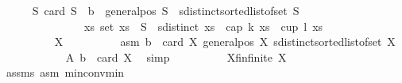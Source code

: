 \begin{isabellebody}
\begin{isamarkuptext}
\end{isamarkuptext}\isamarkuptrue%
\ \ \ \ \isamarkupfalse%
\ {\isachardoublequoteopen}{\isasymforall}S{\isachardot}{\kern0pt}\ card\ S\ {\isacharequal}{\kern0pt}\ {\isacharquery}{\kern0pt}b\ {\isasymand}\ general{\isacharunderscore}{\kern0pt}pos\ S\ {\isasymand}\ sdistinct{\isacharparenleft}{\kern0pt}sorted{\isacharunderscore}{\kern0pt}list{\isacharunderscore}{\kern0pt}of{\isacharunderscore}{\kern0pt}set\ S{\isacharparenright}{\kern0pt}\ \isanewline
\ \ \ \ \ \ \ \ \ \ \ \ \ \ {\isasymlongrightarrow}\ {\isacharparenleft}{\kern0pt}{\isasymexists}xs{\isachardot}{\kern0pt}\ {\isacharparenleft}{\kern0pt}set\ xs\ {\isasymsubseteq}\ S\ {\isasymand}\ sdistinct\ xs\ {\isasymand}\ {\isacharparenleft}{\kern0pt}cap\ k\ xs\ {\isasymor}\ cup\ l\ xs{\isacharparenright}{\kern0pt}{\isacharparenright}{\kern0pt}{\isacharparenright}{\kern0pt}{\isachardoublequoteclose}\isanewline
\ \ \ \ \isamarkupfalse%
{\isacharminus}{\kern0pt}\isanewline
\ \ \ \ \ \ \isakeywordONE{{\isacharbraceleft}{\kern0pt}}\isamarkupfalse%
\isanewline
\ \ \ \ \ \ \ \ \isamarkupfalse%
\ X\isanewline
\ \ \ \ \ \ \ \ \isamarkupfalse%
\ asm{\isacharcolon}{\kern0pt}\ {\isachardoublequoteopen}{\isacharquery}{\kern0pt}b\ {\isacharequal}{\kern0pt}\ card\ X{\isachardoublequoteclose}\ {\isachardoublequoteopen}general{\isacharunderscore}{\kern0pt}pos\ X{\isachardoublequoteclose}\ {\isachardoublequoteopen}sdistinct{\isacharparenleft}{\kern0pt}sorted{\isacharunderscore}{\kern0pt}list{\isacharunderscore}{\kern0pt}of{\isacharunderscore}{\kern0pt}set\ X{\isacharparenright}{\kern0pt}{\isachardoublequoteclose}\isanewline
\ \ \ \ \ \ \ \ \isamarkupfalse%
\ \ \ A{}{\isacharcolon}{\kern0pt}\ {\isachardoublequoteopen}{\isacharquery}{\kern0pt}b\ {\isasymle}\ card\ X{\isachardoublequoteclose}\ \isamarkupfalse%
\ simp\isanewline
\ \ \ \ \ \ \ \ \isamarkupfalse%
\ X{\isacharunderscore}{\kern0pt}fin{\isacharcolon}{\kern0pt}{\isachardoublequoteopen}finite\ X{\isachardoublequoteclose}\ \isamarkupfalse%
\ assms{\isacharparenleft}{\kern0pt}{}{\isacharcomma}{\kern0pt}{}{\isacharcomma}{\kern0pt}{}{\isacharparenright}{\kern0pt}\ asm{\isacharparenleft}{\kern0pt}{}{\isacharparenright}{\kern0pt}\ min{\isacharunderscore}{\kern0pt}conv{\isacharunderscore}{\kern0pt}min\isanewline
\ \ \ \ \ \ \ \ \ \ \isamarkupfalse%

\end{isabellebody}
